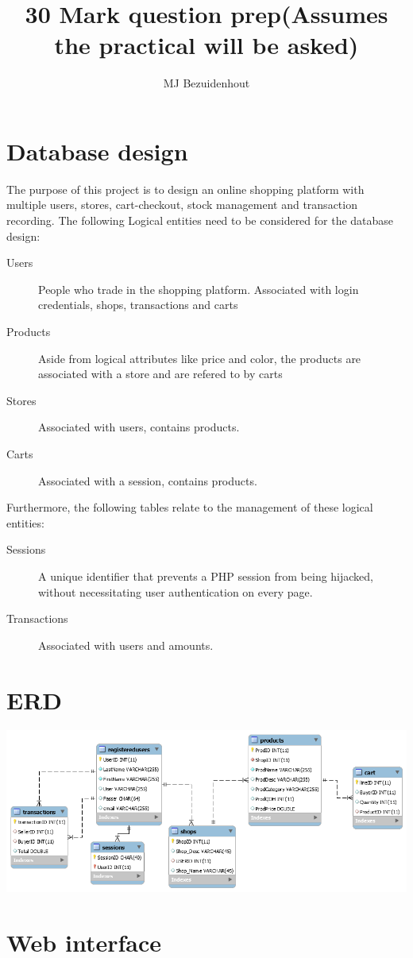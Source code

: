 \documentclass{article}
\title{30 Mark question prep(Assumes the practical will be asked)}
\author{MJ Bezuidenhout}
\begin{document}
\maketitle
\section{Database design}
The purpose of this project is to design an online shopping platform with multiple users, stores, cart-checkout, stock management and transaction recording. 
The following Logical entities need to be considered for the database design:
\begin{description}
\item[Users] People who trade in the shopping platform. Associated with login credentials, shops, transactions and carts
\item[Products] Aside from logical attributes like price and color, the products are associated with a store and are refered to by carts
\item[Stores] Associated with users, contains products. 
\item[Carts] Associated with a session, contains products.
\end{description}  
Furthermore, the following tables relate to the management of these logical entities:
\begin{description}
\item[Sessions] A unique identifier that prevents a PHP session from being hijacked, without necessitating user authentication on every page.
\item[Transactions]Associated with users and amounts. 
\end{description}


\section{ERD}
\includegraphics[width=1\textwidth]{ERD}
\section{Web interface}
\end{document}
